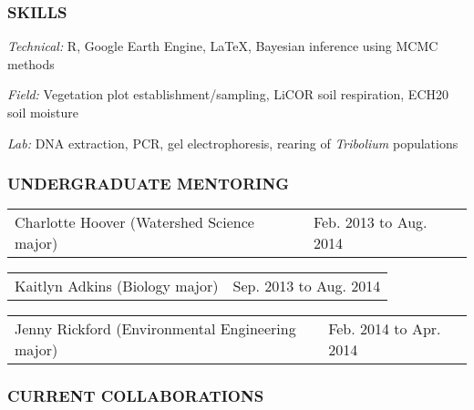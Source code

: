 \documentclass[11pt,english]{article}
\providecommand{\tabularnewline}{\\}
\begin{document}

\subsubsection*{SKILLS}
\vspace{-0.5ex}

\begin{hangparas}{0.25in}{1}
\hspace{0.575em}\emph{Technical:} R, Google Earth Engine, \LaTeX{}, Bayesian inference using MCMC methods

\hspace{0.575em}\emph{Field:} Vegetation plot establishment/sampling, LiCOR soil respiration, ECH20 soil moisture 

\hspace{0.575em}\emph{Lab:} DNA extraction, PCR, gel electrophoresis, rearing of \emph{Tribolium} populations

\end{hangparas}
\vspace{1ex}


\subsubsection*{UNDERGRADUATE MENTORING}
\vspace{-0.5ex}

\begin{tabular}{>{\raggedright}p{4in}>{\raggedleft}p{2in}}
Charlotte Hoover (Watershed Science major) & Feb. 2013 to Aug. 2014 \tabularnewline
\end{tabular}

\begin{tabular}{>{\raggedright}p{4in}>{\raggedleft}p{2in}}
Kaitlyn Adkins (Biology major) & Sep. 2013 to Aug. 2014\tabularnewline
\end{tabular}

\begin{tabular}{>{\raggedright}p{4in}>{\raggedleft}p{2in}}
Jenny Rickford (Environmental Engineering major) & Feb. 2014 to Apr. 2014
\end{tabular}


\subsubsection*{CURRENT COLLABORATIONS}
\vspace{-0.5ex}
\end{document}
